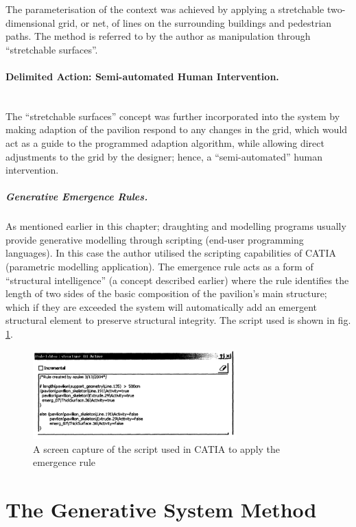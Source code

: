 The parameterisation of the context was achieved by applying a stretchable two-dimensional grid, or net, of lines on the surrounding buildings and pedestrian paths. The method is referred to by the author as manipulation through ``stretchable surfaces''.

\paragraph{Delimited Action: Semi-automated Human Intervention.}\mbox{}\\
The ``stretchable surfaces'' concept was further incorporated into the system by making adaption of the pavilion respond to any changes in the grid, which would act as a guide to the programmed adaption algorithm, while allowing direct adjustments to the grid by the designer; hence, a ``semi-automated'' human intervention.

\subparagraph{Generative Emergence Rules.} As mentioned earlier in this chapter; draughting and modelling programs usually provide generative modelling through scripting (end-user programming languages). In this case the author \cite{zulas04} utilised the scripting capabilities of CATIA (parametric modelling application). The emergence rule acts as a form of ``structural intelligence'' (a concept described earlier) where the rule identifies the length of two sides of the basic composition of the pavilion's main structure; which if they are exceeded the system will automatically add an emergent structural element to preserve structural integrity. The script used is shown in fig. \ref{fig:EmergRuleScr}.

\begin{figure}[htbp]
\centering
\includegraphics[width=0.7\textwidth]{./Images/14-EmergRuleScr}
\caption[Emergence Rule Script]{A screen capture of the script used in CATIA to apply the emergence rule \cite{zulas04}}
\label{fig:EmergRuleScr}
\end{figure}

\clearpage
\section{The Generative System Method}

